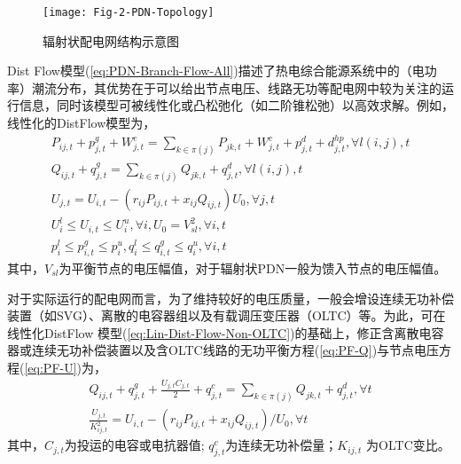 \begin{figure}[H]
\centering
\texttt{[image: Fig-2-PDN-Topology]}
\caption{辐射状配电网结构示意图}
\label{Fig:PDN-Topology}
\end{figure}

Dist Flow模型(\ref{eq:PDN-Branch-Flow-All})描述了热电综合能源系统中的（电功率）潮流分布，其优势在于可以给出节点电压、线路无功等配电网中较为关注的运行信息，同时该模型可被线性化或凸松弛化（如二阶锥松弛\cite{Thesis-Liubin}）以高效求解。例如，线性化的DistFlow模型为\cite{BFM-Lin-1,BFM-Lin-2}，
\begin{subequations}
\label{eq:Lin-Dist-Flow-Non-OLTC}
\begin{gather}
P_{ij,t} + p_{j,t}^g + W_{j,t}^e = \sum_{k \in \pi(j)} P_{jk,t} + W_{j,t}^c + p_{j,t}^d + d_{j,t}^{hp}, \forall l(i,j),t \label{eq:PF-P} \\
Q_{ij,t} + q_{j,t}^g = \sum_{k \in \pi(j)} Q_{jk,t} + q_{j,t}^d, \forall l(i,j),t \label{eq:PF-Q} \\
U_{j,t} = U_{i,t} - ({r_{ij} P_{ij,t} + x_{ij} Q_{ij,t}}){U_0}, \forall j,t \label{eq:PF-U} \\
U_i^l \le {U_{i,t}} \le U_i^u,\forall i,{U_0} = V_{sl}^2 , \forall i,t \\
p_i^l \le p_{i,t}^g \le p_i^u,q_i^l \le q_{i,t}^g \le q_i^u, \forall i,t
\end{gather}
\end{subequations}
其中，$V_{sl}$为平衡节点的电压幅值，对于辐射状PDN一般为馈入节点的电压幅值。

%

对于实际运行的配电网而言，为了维持较好的电压质量，一般会增设连续无功补偿装置（如SVG）、离散的电容器组以及有载调压变压器（OLTC）等。为此，可在线性化DistFlow 模型(\ref{eq:Lin-Dist-Flow-Non-OLTC})的基础上，修正含离散电容器或连续无功补偿装置以及含OLTC线路的无功平衡方程(\ref{eq:PF-Q})与节点电压方程(\ref{eq:PF-U})为\cite{PDN-Model-Reactive-Power-DT-16, CAES-IES-16-Rui}，
\begin{subequations}
\label{eq:Lin-Dist-Flow-Plus-OLTC}
\begin{gather}
{Q_{ij,t}} + q_{j,t}^g + \frac{{{U_{j,t}}{C_{j,t}}}}{2} + {q_{j,t}^c} = \sum\limits_{k \in \pi \left( j \right)} {{Q_{jk,t}}}  + q_{j,t}^d,\forall t \label{eq:Lin-Dist-Flow-Plus-OLTC-1}\\
\frac{{{U_{j,t}}}}{{K_{ij,t}^2}} = {U_{i,t}} - \left( {{r_{ij}}{P_{ij,t}} + {x_{ij}}{Q_{ij,t}}} \right)/{U_0},\forall t\label{eq:Lin-Dist-Flow-Plus-OLTC-2}
\end{gather}
\end{subequations}
其中，${C_{j,t}}$为投运的电容或电抗器值; $q_{j,t}^{c}$为连续无功补偿量；$K_{ij,t}^{}$ 为OLTC变比。


